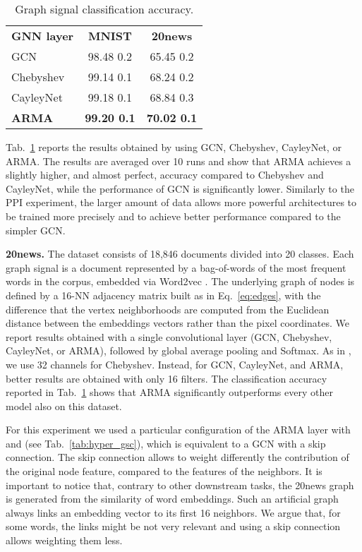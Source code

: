 \documentclass{article}
\begin{document}
\begin{table}
\caption{Graph signal classification accuracy.}
\setlength\tabcolsep{.7em} \small
\centering
\bgroup
\def\arraystretch{1.0} \begin{tabular}{lcc}
\cmidrule[1.5pt]{1-3}
\textbf{GNN layer} & \textbf{MNIST} & \textbf{20news} \\
\cmidrule[.5pt]{1-3}
GCN             & 98.48 {\tiny 0.2} & 65.45 {\tiny 0.2} \\
Chebyshev       & 99.14 {\tiny 0.1} & 68.24 {\tiny 0.2} \\
CayleyNet       & 99.18 {\tiny 0.1} & 68.84 {\tiny 0.3} \\
\textbf{ARMA}   & \textbf{99.20 {\tiny 0.1}} & \textbf{70.02 {\tiny 0.1}} \\
\cmidrule[1.5pt]{1-3}
\end{tabular}
\label{tab:gsc_res}
\egroup
\end{table}


Tab.~\ref{tab:gsc_res} reports the results obtained by using GCN, Chebyshev, CayleyNet, or ARMA.
The results are averaged over 10 runs and show that ARMA achieves a slightly higher, and almost perfect, accuracy compared to Chebyshev and CayleyNet, while the performance of GCN is significantly lower.
Similarly to the PPI experiment, the larger amount of data allows more powerful architectures to be trained more precisely and to achieve better performance compared to the simpler GCN.

\textbf{20news.}
The dataset consists of 18,846 documents divided into 20 classes.
Each graph signal is a document represented by a bag-of-words of the  most frequent words in the corpus, embedded via Word2vec \cite{mikolov2013efficient}. 
The underlying graph of  nodes is defined by a 16-NN adjacency matrix built as in Eq.~\eqref{eq:edges}, with the difference that the vertex neighborhoods are computed from the Euclidean distance between the embeddings vectors rather than the pixel coordinates.
We report results obtained with a single convolutional layer (GCN, Chebyshev, CayleyNet, or ARMA), followed by global average pooling and Softmax. 
As in \cite{defferrard2016convolutional}, we use 32 channels for Chebyshev. 
Instead, for GCN, CayleyNet, and ARMA, better results are obtained with only 16 filters.
The classification accuracy reported in Tab.~\ref{tab:gsc_res} shows that ARMA significantly outperforms every other model also on this dataset.

For this experiment we used a particular configuration of the ARMA layer with  and  (see Tab.~\ref{tab:hyper_gsc}), which is equivalent to a GCN with a skip connection.
The skip connection allows to weight differently the contribution of the original node feature, compared to the features of the neighbors.
It is important to notice that, contrary to other downstream tasks, the 20news graph is generated from the similarity of word embeddings. 
Such an artificial graph always links an embedding vector to its first 16 neighbors.
We argue that, for some words, the links might be not very relevant and using a skip connection allows weighting them less.
\end{document}
